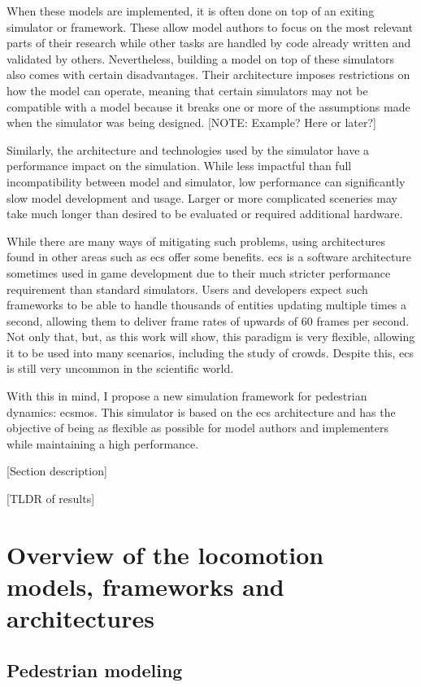 \documentclass[twoside, 11pt]{article}
\begin{document}
When these models are implemented, it is often done on top of an exiting simulator or framework. These allow model authors to focus on the most relevant parts of their research while other tasks are handled by code already written and validated by others. Nevertheless, building a model on top of these simulators also comes with certain disadvantages. Their architecture imposes restrictions on how the model can operate, meaning that certain simulators may not be compatible with a model because it breaks one or more of the assumptions made when the simulator was being designed. [NOTE: Example? Here or later?]

Similarly, the architecture and technologies used by the simulator have a performance impact on the simulation. While less impactful than full incompatibility between model and simulator, low performance can significantly slow model development and usage. Larger or more complicated sceneries may take much longer than desired to be evaluated or required additional hardware.

While there are many ways of mitigating such problems, using architectures found in other areas such as \gls{ecs} offer some benefits. \gls{ecs} is a software architecture sometimes used in game development due to their much stricter performance requirement than standard simulators. Users and developers expect such frameworks to be able to handle thousands of entities updating multiple times a second, allowing them to deliver frame rates of upwards of 60 frames per second. Not only that, but, as this work will show, this paradigm is very flexible, allowing it to be used into many scenarios, including the study of crowds. Despite this, \gls{ecs} is still very uncommon in the scientific world.

With this in mind, I propose a new simulation framework for pedestrian dynamics: \gls{ecsmos}. This simulator is based on the \gls{ecs} architecture and has the objective of being as flexible as possible for model authors and implementers while maintaining a high performance.

[Section description]

[TLDR of results]

\section{Overview of the locomotion models, frameworks and architectures} \label{overview}

\subsection{Pedestrian modeling}
\end{document}
